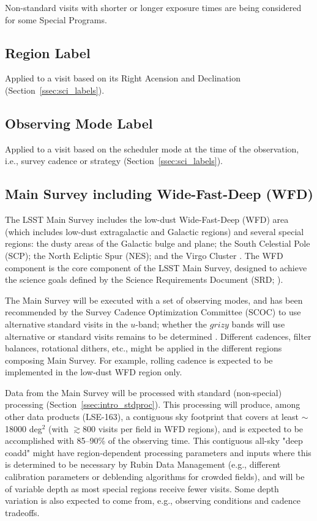 Non-standard visits with shorter or longer exposure times are being
considered for some Special Programs.

\subsection{Region Label}

Applied to a visit based on its Right Acension and Declination (Section~\ref{ssec:sci_labels}).

\subsection{Observing Mode Label}

Applied to a visit based on the scheduler mode at the time of the observation,
i.e., survey cadence or strategy (Section~\ref{ssec:sci_labels}).

\subsection{Main Survey including Wide-Fast-Deep (WFD)}

The LSST Main Survey includes the low-dust Wide-Fast-Deep (WFD) area 
(which includes low-dust extragalactic and Galactic regions) 
and several special regions:
the dusty areas of the Galactic bulge and plane; the South Celestial Pole (SCP); 
the North Ecliptic Spur (NES); and the Virgo Cluster .
The WFD component is the core component of the LSST Main Survey, designed to achieve the science 
goals defined by the Science Requirements Document (SRD; ).

The Main Survey will be executed with a set of observing modes, and 
has been recommended by the Survey Cadence Optimization Committee (SCOC)
to use alternative standard visits in the $u$-band;
whether the $grizy$ bands will use alternative or standard visits
remains to be determined .
Different cadences, filter balances, rotational dithers, etc., 
might be applied in the different regions composing Main Survey.
For example, rolling cadence is expected to be implemented in the low-dust 
WFD region only.

Data from the Main Survey will be processed with standard (non-special) processing (Section~\ref{ssec:intro_stdproc}).
This processing will produce, among other data products (LSE-163), 
a contiguous sky footprint that covers at 
least $\sim$18000 deg$^2$ (with $\gtrsim$800 visits per field in WFD regions), 
and is expected to be accomplished with 85--90\% of the observing time.
This contiguous all-sky "deep coadd" might have region-dependent processing parameters and inputs
where this is determined to be necessary by Rubin Data Management
(e.g., different calibration parameters or deblending algorithms for crowded fields),
and will be of variable depth as most special regions receive fewer visits.
Some depth variation is also expected to come from, e.g., observing conditions and cadence tradeoffs.

